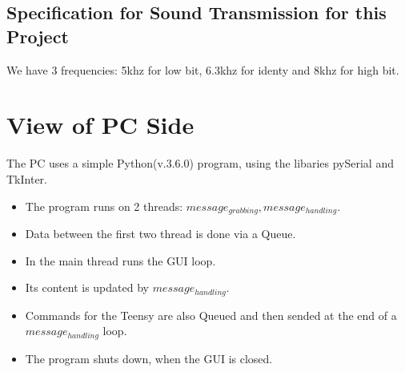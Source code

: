 \documentclass{book}
\begin{document}
\section{Specification for Sound Transmission for this Project}
We have 3 frequencies: 5khz for low bit, 6.3khz for identy and 8khz for high bit.

\chapter{View of PC Side}
The PC uses a simple Python(v.3.6.0) program, using the libaries pySerial and TkInter.
\begin{itemize}
\item The program runs on 2 threads: $message_{grabbing}, message_{handling}$.
\item Data between the first two thread is done via a Queue.
\item In the main thread runs the GUI loop.
\item Its content is updated by $message_{handling}$.
\item Commands for the Teensy are also Queued and then sended at the end of a $message_{handling}$ loop.
\item The program shuts down, when the GUI is closed.
\end{itemize} 
\end{document}
